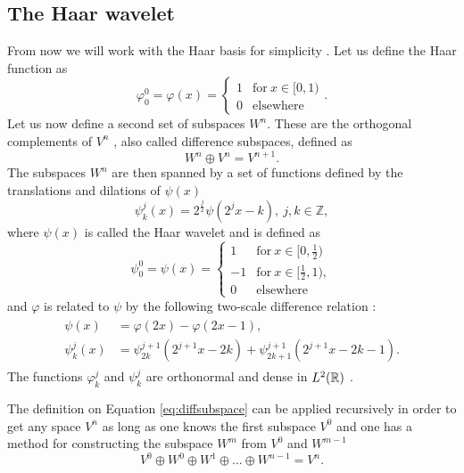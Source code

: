 \documentclass[../Thesis.tex]{subfiles}
\begin{document}
\subsection{The Haar wavelet}
From now we will work with the Haar basis for simplicity \cite{Beylkin:MRA}.
Let us define the Haar function \cite{Schneider:2007} as
\begin{equation}
  \varphi^0_0 = \varphi(x) =
  \begin{cases}
  1 & \text{for} \ x\in [0,1)\\
  0 & \text{elsewhere}
\end{cases}.
\end{equation}
Let us now define a second set of subspaces $W^n$. These are the orthogonal complements of $V^n$ \cite{Alpert1993}, also called difference subspaces,
defined as \cite{Beylkin:MRA, Sorland, Alpert1993}
\begin{equation}
  W^n \oplus V^n = V^{n + 1}. \label{eq:diffsubspace}
\end{equation}
The subspaces $W^n$ are then spanned by a set of functions defined by the translations and
dilations of $\psi(x)$
\begin{equation}
  \psi_k^j(x) = 2^{\frac{j}{2}}\psi(2^jx - k),\  j,k \in \mathbb{Z} \label{eq:haarwavelet},
\end{equation}
where $\psi(x)$ is called the Haar wavelet \cite{Schneider:2007} and is defined as
\begin{equation}
  \psi^0_0 = \psi(x) =
  \begin{cases}
  1 & \text{for} \ x\in [0,\frac{1}{2})\\
  -1 & \text{for}\ x\in [\frac{1}{2}, 1),\\
  0 & \text{elsewhere}
\end{cases}
\end{equation}
and $\varphi$ is related to $\psi$ by the following two-scale difference relation \cite{Beylkin:MRA, Schneider:2007, Sorland}:
\begin{align}
  \begin{split}\label{eq:2scalewavelet}
    \psi(x) &= \varphi(2x) - \varphi(2x - 1),\\
    \psi^j_k(x) &= \psi^{j+1}_{2k}(2^{j+1}x - 2k) + \psi^{j+1}_{2k+1}(2^{j+1}x - 2k - 1).
  \end{split}
\end{align}
The functions $\varphi^j_k$ and $\psi^j_k$ are orthonormal
and dense in $L^2(\mathbb{R})$ \cite{Beylkin:MRA, Sorland, SRJensen:2014}.

The definition on Equation \ref{eq:diffsubspace} can be applied recursively in order to
get any space $V^n$ as long as one knows the first subspace $V^0$ and one has a method for constructing the
subspace $W^m$ from $V^0$ and $W^{m-1}$
\begin{equation}
    V^0 \oplus W^0 \oplus W^1 \oplus ... \oplus W^{n-1}  = V^n. \label{eq:recursivespace}
\end{equation}
\end{document}
